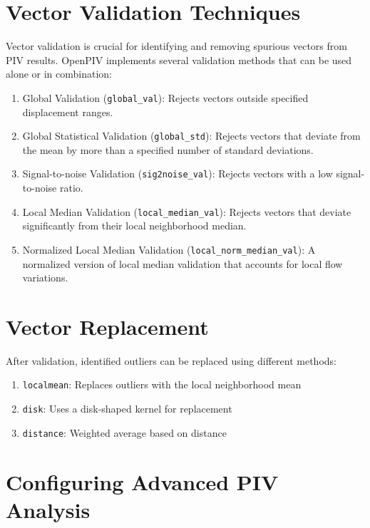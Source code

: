 \documentclass[
  english,
  letterpaper,
  numbers=noendperiod,
  DIV=13]{scrreprt}
\providecommand{\tightlist}{%
  \setlength{\itemsep}{0pt}\setlength{\parskip}{0pt}}
\begin{document}
\section{Vector Validation
Techniques}\label{vector-validation-techniques}

Vector validation is crucial for identifying and removing spurious
vectors from PIV results. OpenPIV implements several validation methods
that can be used alone or in combination:

\begin{enumerate}
\def\labelenumi{\arabic{enumi}.}
\tightlist
\item
  Global Validation (\texttt{global\_val}): Rejects vectors outside
  specified displacement ranges.
\item
  Global Statistical Validation (\texttt{global\_std}): Rejects vectors
  that deviate from the mean by more than a specified number of standard
  deviations.
\item
  Signal-to-noise Validation (\texttt{sig2noise\_val}): Rejects vectors
  with a low signal-to-noise ratio.
\item
  Local Median Validation (\texttt{local\_median\_val}): Rejects vectors
  that deviate significantly from their local neighborhood median.
\item
  Normalized Local Median Validation
  (\texttt{local\_norm\_median\_val}): A normalized version of local
  median validation that accounts for local flow variations.
\end{enumerate}

\section{Vector Replacement}\label{vector-replacement}

After validation, identified outliers can be replaced using different
methods:

\begin{enumerate}
\def\labelenumi{\arabic{enumi}.}
\tightlist
\item
  \texttt{localmean}: Replaces outliers with the local neighborhood mean
\item
  \texttt{disk}: Uses a disk-shaped kernel for replacement
\item
  \texttt{distance}: Weighted average based on distance
\end{enumerate}

\section{Configuring Advanced PIV
Analysis}\label{configuring-advanced-piv-analysis}
\end{document}
